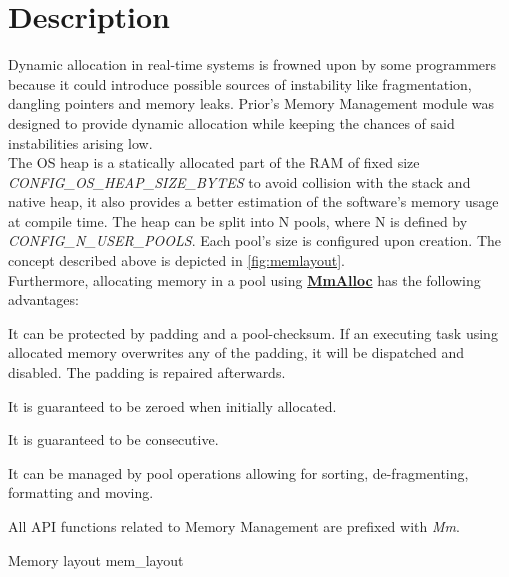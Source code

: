 \section{Description}


Dynamic allocation in real-time systems is frowned upon by some programmers because it could introduce possible sources of instability like fragmentation, dangling pointers and memory leaks. Prior’s Memory Management module was designed to provide dynamic allocation while keeping the chances of said instabilities arising low.\\
The OS heap is a statically allocated part of the RAM of fixed size \textit{CONFIG\_OS\_HEAP\_SIZE\_BYTES} to avoid collision with the stack and native heap, it also provides a better estimation of the software’s memory usage at compile time. The heap can be split into N pools, where N is defined by \textit{CONFIG\_N\_USER\_POOLS}. Each pool’s size is configured upon creation. The concept described above is depicted in \cref{fig:memlayout}.\\
Furthermore, allocating memory in a pool using \hyperref[func:MmAlloc]{\textbf{MmAlloc}} has the following advantages:
\begin{pditemize}
\item It can be protected by padding and a pool-checksum. If an executing task using allocated memory overwrites any of the padding, it will be dispatched and disabled. The padding is repaired afterwards.
\item It is guaranteed to be zeroed when initially allocated.
\item It is guaranteed to be consecutive.
\item It can be managed by pool operations allowing for sorting, de-fragmenting, formatting and moving.
\end{pditemize}
All API functions related to Memory Management are prefixed with \textit{Mm}.

\begin{pdfigure}
	{\texttt{}Memory layout}
	{mem_layout}
\end{pdfigure}

\FloatBarrier